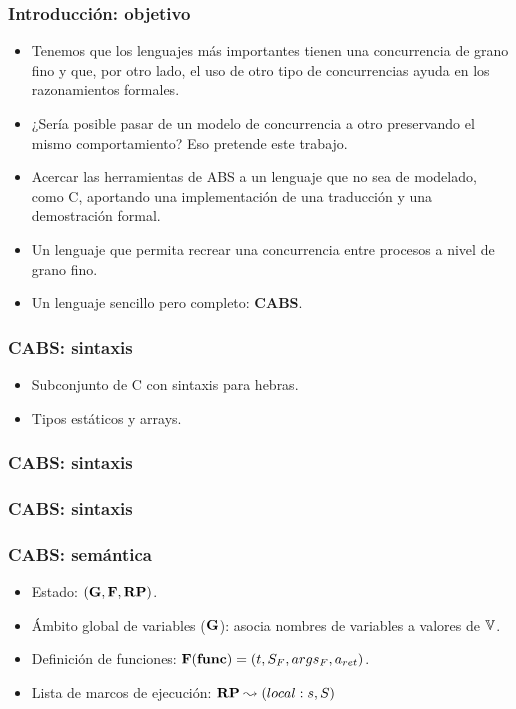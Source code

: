 \documentclass[spanish, a4paper, 12pt, final, slideColor, nototal, colorBG, pdf, noaccumulate, darkblue] {beamer}
\begin{document}
\begin{frame}
  \frametitle{Introducción: objetivo}
  \begin{itemize}
  \item Tenemos que los lenguajes más importantes tienen una concurrencia de grano fino y que, por otro lado, el uso de otro tipo de concurrencias ayuda en los razonamientos formales.
  \item ¿Sería posible pasar de un modelo de concurrencia a otro preservando el mismo comportamiento? Eso pretende este trabajo.
  \item Acercar las herramientas de ABS a un lenguaje que no sea de modelado, como C, aportando una implementación de una traducción y una demostración formal.
  \item Un lenguaje que permita recrear una concurrencia entre procesos a nivel de grano fino.
  \item Un lenguaje sencillo pero completo: \textbf{CABS}.
  \end{itemize}
\end{frame}

\begin{frame}[fragile]
  \frametitle{CABS: sintaxis}
  \begin{itemize}
  \item Subconjunto de C con sintaxis para hebras.
  \item Tipos estáticos y arrays.
  \end{itemize}
  
\end{frame}

\begin{frame}[fragile]
  \frametitle{CABS: sintaxis}
    \fontsize{7}{7.2}\selectfont
    
\end{frame}

\begin{frame}[fragile]
  \frametitle{CABS: sintaxis}
  
\end{frame}

\begin{frame}
  \frametitle{CABS: semántica}
  \begin{itemize}
  \item Estado: $(\mathbf{G}, \mathbf{F}, \textbf{RP})$.
  \item Ámbito global de variables ($\mathbf{G}$): asocia nombres de variables a valores de $\mathbb{V}$.
  \item Definición de funciones: $\mathbf{F}(\textbf{func}) = (t, S_F, args_F, a_{ret})$.
  \item Lista de marcos de ejecución: $\textbf{RP} \leadsto (local:s, S)$
  \end{itemize}
\end{frame}
\end{document}
